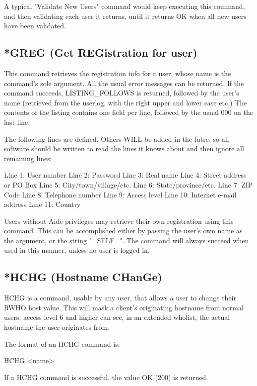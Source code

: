  A typical "Validate New Users" command would keep executing this command,
and then validating each user it returns, until it returns OK when all new
users have been validated.



\subsection{*GREG (Get REGistration for user)}

 This command retrieves the registration info for a user, whose name is the
command's sole argument.  All the usual error messages can be returned.  If
the command succeeds, LISTING_FOLLOWS is returned, followed by the user's name
(retrieved from the userlog, with the right upper and lower case etc.)  The
contents of the listing contains one field per line, followed by the usual
000 on the last line.

 The following lines are defined.  Others WILL be added in the futre, so all
software should be written to read the lines it knows about and then ignore
all remaining lines:

 Line 1:  User number
 Line 2:  Password
 Line 3:  Real name
 Line 4:  Street address or PO Box
 Line 5:  City/town/village/etc.
 Line 6:  State/province/etc.
 Line 7:  ZIP Code
 Line 8:  Telephone number
 Line 9:  Access level
 Line 10: Internet e-mail address
 Line 11: Country

 Users without Aide privileges may retrieve their own registration using
this command.  This can be accomplished either by passing the user's own
name as the argument, or the string "_SELF_".  The command will always
succeed when used in this manner, unless no user is logged in.



\subsection{*HCHG (Hostname CHanGe)}

 HCHG is a command, usable by any user, that allows a user to change their RWHO
host value.  This will mask a client's originating hostname from normal
users; access level 6 and higher can see, in an extended wholist, the actual
hostname the user originates from.

 The format of an HCHG command is:

 HCHG <name>

 If a HCHG command is successful, the value OK (200) is returned.



